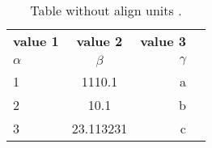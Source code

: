 \documentclass{article}
\begin{document}
	\begin{table}[h!]
		\begin{center}
			\caption{Table without align units .}
			\label{tab:Table 1}
			\begin{tabular}{l|c|r|c}
				\textbf{value 1} & \textbf{value 2} & \textbf{value 3}\\
				$\alpha$ & $\beta$ & $\gamma$ \\
				\hline
				1 & 1110.1 & a\\
				2 & 10.1 & b\\
				3 & 23.113231 & c\\
				\end{tabular}
			\end{center}
		\end{table}
\end{document}
